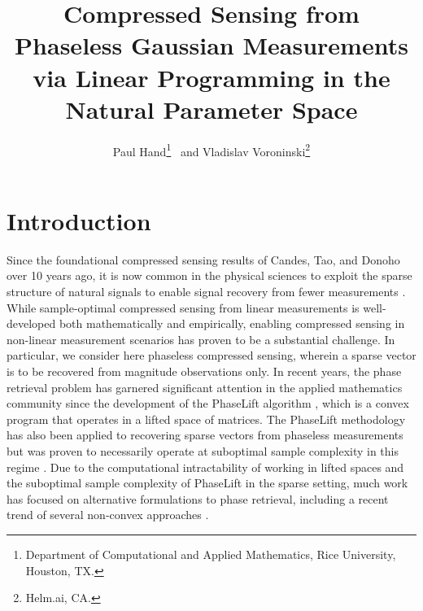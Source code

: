 \documentclass[12pt]{article}
\title{Compressed Sensing from Phaseless Gaussian Measurements via Linear Programming in the Natural Parameter Space }
\author{
Paul Hand\footnote{Department of Computational and Applied Mathematics, Rice University,  Houston, TX.} \   and Vladislav Voroninski\footnote{Helm.ai, CA.}}
\newcommand{\1}{\mathbf{1}}
\begin{document}
\maketitle
{}

\section{Introduction}

Since the foundational compressed sensing results of Candes, Tao, and Donoho over 10 years ago, it is now common in the physical sciences to exploit the sparse structure of natural signals to enable signal recovery from fewer measurements \cite{CRT2005, donoho2001uncertainty}. While sample-optimal compressed sensing from linear measurements is well-developed both mathematically and empirically, enabling compressed sensing in non-linear measurement scenarios has proven to be a substantial challenge. In particular, we consider here phaseless compressed sensing, wherein a sparse vector is to be recovered from magnitude observations only.    In recent years, the phase retrieval problem has garnered significant attention in the applied mathematics community since the development of the PhaseLift algorithm \cite{CESV2011, CSV2013}, which is a convex program that operates in a lifted space of matrices. The PhaseLift methodology has also been applied to recovering sparse vectors from phaseless measurements but was proven to necessarily operate at suboptimal sample complexity in this regime  \cite{li2013sparse}. Due to the computational intractability of working in lifted spaces and the suboptimal sample complexity of PhaseLift in the sparse setting, much work has focused on alternative formulations to phase retrieval, including a recent trend of several non-convex approaches \cite{altminphase, wirtinger, twf, SQW2016, yoninaTAF}.
\end{document}
